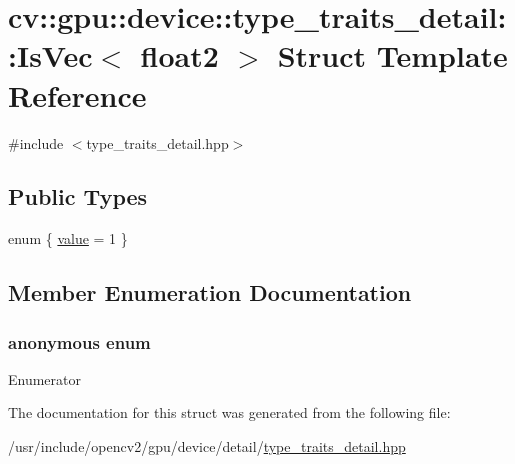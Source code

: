 \hypertarget{structcv_1_1gpu_1_1device_1_1type__traits__detail_1_1IsVec_3_01float2_01_4}{\section{cv\-:\-:gpu\-:\-:device\-:\-:type\-\_\-traits\-\_\-detail\-:\-:Is\-Vec$<$ float2 $>$ Struct Template Reference}
\label{structcv_1_1gpu_1_1device_1_1type__traits__detail_1_1IsVec_3_01float2_01_4}
}


{\ttfamily \#include $<$type\-\_\-traits\-\_\-detail.\-hpp$>$}

\subsection*{Public Types}
\begin{DoxyCompactItemize}
\item 
enum \{ \hyperlink{structcv_1_1gpu_1_1device_1_1type__traits__detail_1_1IsVec_3_01float2_01_4_ace8553e9f5bcbeb58ea9e6727eb94a25a059848e10a8717f36436eb5457b0a7fe}{value} = 1
 \}
\end{DoxyCompactItemize}


\subsection{Member Enumeration Documentation}
\hypertarget{structcv_1_1gpu_1_1device_1_1type__traits__detail_1_1IsVec_3_01float2_01_4_ace8553e9f5bcbeb58ea9e6727eb94a25}{\subsubsection[{anonymous enum}]{\setlength{\rightskip}{0pt plus 5cm}anonymous enum}}\label{structcv_1_1gpu_1_1device_1_1type__traits__detail_1_1IsVec_3_01float2_01_4_ace8553e9f5bcbeb58ea9e6727eb94a25}
\begin{Desc}
\item[Enumerator]\par
\begin{description}
\item[{\em 
\hypertarget{structcv_1_1gpu_1_1device_1_1type__traits__detail_1_1IsVec_3_01float2_01_4_ace8553e9f5bcbeb58ea9e6727eb94a25a059848e10a8717f36436eb5457b0a7fe}{value}\label{structcv_1_1gpu_1_1device_1_1type__traits__detail_1_1IsVec_3_01float2_01_4_ace8553e9f5bcbeb58ea9e6727eb94a25a059848e10a8717f36436eb5457b0a7fe}
}]\end{description}
\end{Desc}


The documentation for this struct was generated from the following file\-:\begin{DoxyCompactItemize}
\item 
/usr/include/opencv2/gpu/device/detail/\hyperlink{type__traits__detail_8hpp}{type\-\_\-traits\-\_\-detail.\-hpp}\end{DoxyCompactItemize}

